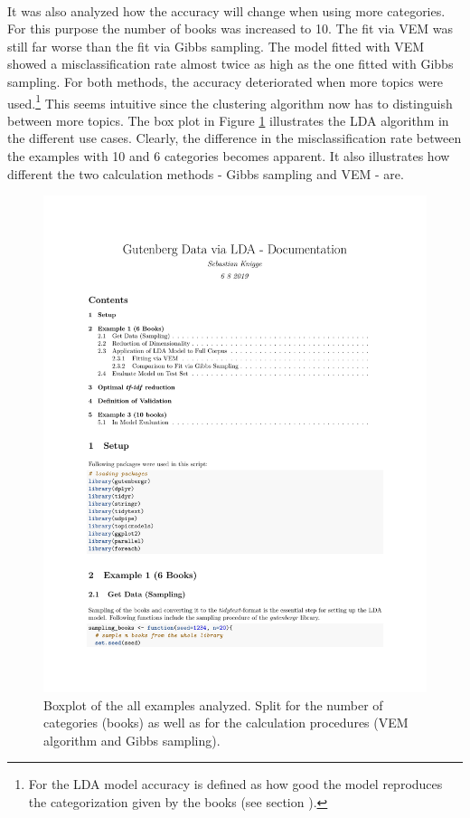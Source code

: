 \documentclass[11pt,a4paper]{article}
\begin{document}
\ \\
It was also analyzed how the accuracy will change when using more categories. For this purpose the number of books was increased to 10. The fit via VEM was still far worse than the fit via Gibbs sampling. The model fitted with VEM showed a misclassification rate almost twice as high as the one fitted with Gibbs sampling. For both methods, the accuracy deteriorated when more topics were used.\footnote{For the LDA model accuracy is defined as how good the model reproduces the categorization given by the books (see section \label{Example1}).} This seems intuitive since the clustering algorithm now has to distinguish between more topics. The box plot in Figure \ref{fig:comparison_boxplot} illustrates the LDA algorithm in the different use cases. Clearly, the difference in the misclassification rate between the examples with 10 and 6 categories becomes apparent. It also illustrates how different the two calculation methods - Gibbs sampling and VEM - are.
\begin{figure}[h]
	\centering
	\includegraphics[page=22, trim=70 400 0 0,clip,width=1.2\textwidth]{LDA_Documentation.pdf}
	\caption{Boxplot of the all examples analyzed. Split for the number of categories (books) as well as for the calculation procedures (VEM algorithm and Gibbs sampling).}
	\label{fig:comparison_boxplot}
\end{figure}
\end{document}
